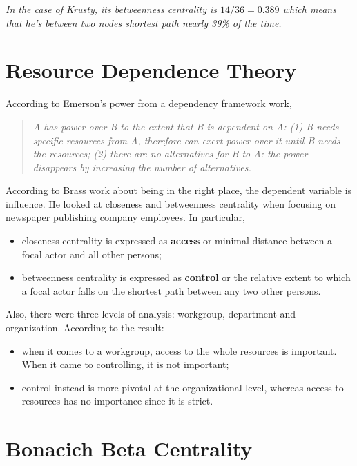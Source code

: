 \documentclass[
  notitlepage,
  onecolumn,
  openany]{book}
\providecommand{\tightlist}{%
  \setlength{\itemsep}{0pt}\setlength{\parskip}{0pt}}
\begin{document}
\emph{In the case of Krusty, its betweenness centrality is \(14/36 = 0.389\) which means that he's between two nodes shortest path nearly 39\% of the time.}

\hypertarget{resource-dependence-theory}{%
\section{Resource Dependence Theory}\label{resource-dependence-theory}}

According to Emerson's power from a dependency framework work,

\begin{quote}
\emph{A has power over B to the extent that B is dependent on A:
(1) B needs specific resources from A, therefore can exert power over it until B needs the resources;
(2) there are no alternatives for B to A: the power disappears by increasing the number of alternatives.}
\end{quote}

According to Brass work about being in the right place, the dependent variable is influence. He looked at closeness and betweenness centrality when focusing on newspaper publishing company employees. In particular,

\begin{itemize}
\tightlist
\item
  closeness centrality is expressed as \textbf{access} or minimal distance between a focal actor and all other persons;
\item
  betweenness centrality is expressed as \textbf{control} or the relative extent to which a focal actor falls on the shortest path between any two other persons.
\end{itemize}

Also, there were three levels of analysis: workgroup, department and organization. According to the result:

\begin{itemize}
\tightlist
\item
  when it comes to a workgroup, access to the whole resources is important. When it came to controlling, it is not important;
\item
  control instead is more pivotal at the organizational level, whereas access to resources has no importance since it is strict.
\end{itemize}

\hypertarget{bonacich-beta-centrality}{%
\section{Bonacich Beta Centrality}\label{bonacich-beta-centrality}}
\end{document}
